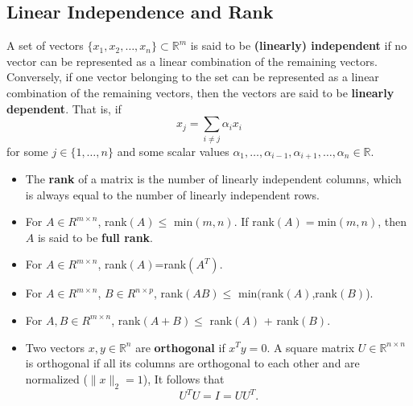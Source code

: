 \subsection{Linear Independence and Rank}
A set of vectors $\{x_{1},x_{2},\ldots,x_{n}\} \subset \mathbb{R}^{m}$ is said to be {\bf (linearly) independent} if 
no vector can be represented as a linear combination of the remaining vectors. Conversely, if one vector 
belonging to the set can be represented as a linear combination of the remaining vectors, then the 
vectors are said to be {\bf linearly dependent}. That is, if 
\begin{equation*}
x_{j}=\sum\limits_{i\neq j}\alpha_{i}x_{i}
\end{equation*}
for some $j \in \{1,\ldots,n\}$ and some scalar values $\alpha_{1}, \ldots, \alpha_{i-1}, \alpha_{i+1}, \ldots, \alpha_{n} \in \mathbb{R}$. 

\begin{itemize}
\item The {\bf rank} of a matrix is the number of linearly independent columns, which is always equal to the number of linearly independent rows. 
\item For $A \in R^{m\times n}$, rank$(A) \leq$ min$(m,n)$. If rank$(A)=$min$(m,n)$, then $A$ is said
to be  {\bf full rank}.
\item  For $A \in R^{m\times n}$, rank$(A)$=rank$(A^{T})$.
\item  For $A \in R^{m\times n}$,  $B \in R^{n\times p}$, rank$(AB) \leq$ min$($rank$(A)$,rank$(B)$).
\item  For $A,B \in R^{m\times n}$, rank$(A+B) \leq$ rank$(A)$ + rank$(B)$.


\item Two vectors $x,y \in \mathbb{R}^{n}$ are {\bf orthogonal} if $x^{T}y=0$. A square matrix $U \in \mathbb{R}^{n\times n}$
is orthogonal if all its columns are orthogonal to each other and are normalized ($\|x\|_{2} = 1$), It follows that
\begin{equation*}
U^{T}U=I=UU^{T}.
\end{equation*}
\end{itemize}



